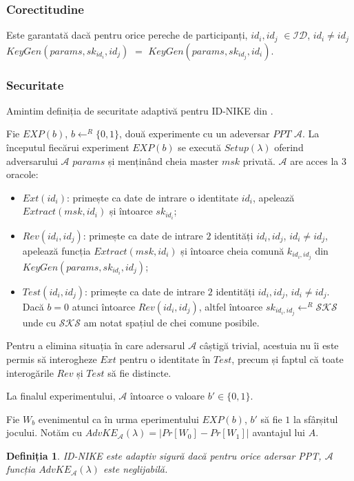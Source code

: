 \documentclass[oneside, 12pt]{book}
\newtheorem{definitie}{\textbf{Definiția}}[section]
\begin{document}
\subsubsection{Corectitudine}
Este garantată dacă pentru orice pereche de participanți, $id_i, id_j$ $\in \mathcal{ID}$, $id_i \neq id_j$ $KeyGen(params, sk_{id_i}, id_j)$ $=$ $KeyGen(params, sk_{id_j}, id_i)$. 

\subsubsection{Securitate}
\label{subsub:nike-security}

Amintim definiția de securitate adaptivă pentru ID-NIKE din \cite{paterson:2009relations}.

Fie $EXP(b)$, $b \leftarrow^R \{0,1\}$, două experimente cu un adeversar $PPT$ $\mathcal{A}$. La începutul fiecărui experiment $EXP(b)$ se execută $Setup(\lambda)$ oferind adversarului $\mathcal{A}$ $params$ și menținând cheia master $msk$ privată. $\mathcal{A}$ are acces la $3$ oracole:
\begin{itemize}
	\item $Ext(id_i)$: primește ca date de intrare o identitate $id_i$, apelează $Extract(msk, id_i)$ și întoarce $sk_{id_i}$;
	\item $Rev(id_i, id_j)$: primește ca date de intrare $2$ identități $id_i, id_j$, $id_i \neq id_j$, apelează funcția $Extract(msk, id_i)$ și întoarce cheia comună $k_{id_i, id_j}$ din $KeyGen(params, sk_{id_i}, id_j)$;
	\item $Test(id_i, id_j)$: primește ca date de intrare $2$ identități $id_i, id_j$, $id_i \neq id_j$. Dacă $b = 0$ atunci întoarce $Rev(id_i, id_j)$, altfel întoarce $sk_{id_i, id_j} \leftarrow^R \mathcal{SKS}$ unde cu $\mathcal{SKS}$ am notat spațiul de chei comune posibile.
\end{itemize}

Pentru a elimina situația în care adersarul $\mathcal{A}$ câștigă trivial, acestuia nu îi este permis să interogheze $Ext$ pentru o identitate în $Test$, precum și faptul că toate interogările $Rev$ și $Test$ să fie distincte.

La finalul experimentului, $\mathcal{A}$ întoarce o valoare $b' \in \{0, 1\}$.

Fie $W_b$ evenimentul ca în urma eperimentului $EXP(b)$, $b'$ să fie $1$ la sfârșitul jocului. Notăm cu $AdvKE_{\mathcal{A}}(\lambda) = |Pr[W_0] - Pr[W_1]|$ avantajul lui $A$.
\\
\begin{definitie}
	ID-NIKE este adaptiv sigură dacă pentru orice adersar PPT, $\mathcal{A}$ funcția $AdvKE_{\mathcal{A}}(\lambda)$ este neglijabilă.
\end{definitie}
\end{document}
